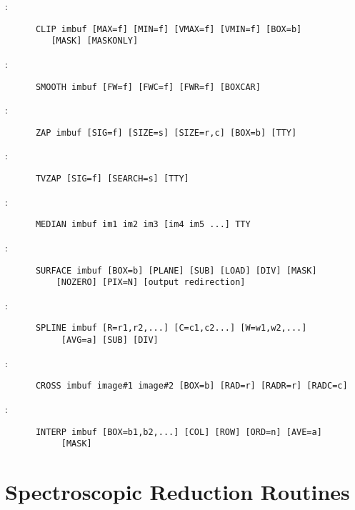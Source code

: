 \noindent {}:
\begin{verbatim}
      CLIP imbuf [MAX=f] [MIN=f] [VMAX=f] [VMIN=f] [BOX=b]
		 [MASK] [MASKONLY]
\end{verbatim}

\noindent {}:
\begin{verbatim}
      SMOOTH imbuf [FW=f] [FWC=f] [FWR=f] [BOXCAR]
\end{verbatim}

\noindent {}:
\begin{verbatim}
      ZAP imbuf [SIG=f] [SIZE=s] [SIZE=r,c] [BOX=b] [TTY]
\end{verbatim}

\noindent {}:
\begin{verbatim}
      TVZAP [SIG=f] [SEARCH=s] [TTY]
\end{verbatim}

\noindent {}:
\begin{verbatim}
      MEDIAN imbuf im1 im2 im3 [im4 im5 ...] TTY
\end{verbatim}

\noindent {}:
\begin{verbatim}
      SURFACE imbuf [BOX=b] [PLANE] [SUB] [LOAD] [DIV] [MASK]
	      [NOZERO] [PIX=N] [output redirection]
\end{verbatim}

\noindent {}:
\begin{verbatim}
      SPLINE imbuf [R=r1,r2,...] [C=c1,c2...] [W=w1,w2,...]
		   [AVG=a] [SUB] [DIV]
\end{verbatim}

\noindent {}:
\begin{verbatim}
      CROSS imbuf image#1 image#2 [BOX=b] [RAD=r] [RADR=r] [RADC=c]
\end{verbatim}

\noindent {}:
\begin{verbatim}
      INTERP imbuf [BOX=b1,b2,...] [COL] [ROW] [ORD=n] [AVE=a]
		   [MASK]
\end{verbatim}


\section{Spectroscopic Reduction Routines}

